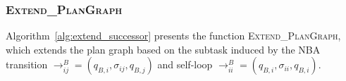 \documentclass[lettersize,journal]{IEEEtran}
\theoremstyle{italiclemma}
\theoremstyle{italiclemma}
\theoremstyle{definition}
\begin{document}






\subsubsection{\textsc{Extend\_PlanGraph}} \label{gen}
Algorithm~\ref{alg:extend_successor} presents the function
\textsc{Extend\_PlanGraph}, which extends the plan graph based on the subtask induced by the NBA transition
$\rightarrow^B_{ij}=(q_{B,i},\sigma_{ij},q_{B,j})$ and self-loop $\rightarrow^B_{ii}=(q_{B,i},\sigma_{ii},q_{B,i})$.
\end{document}
